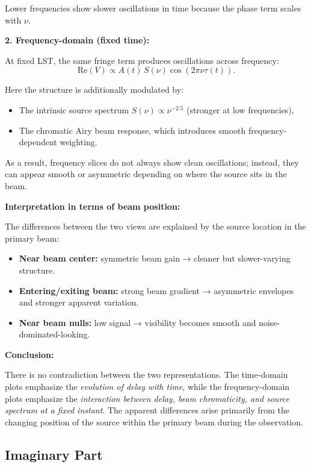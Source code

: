\documentclass{article}
\begin{document}
Lower frequencies show slower oscillations in time because the phase term scales with $\nu$.

\vspace{0.5em}
\textbf{2. Frequency-domain (fixed time):}

At fixed LST, the same fringe term produces oscillations across frequency:
\[
\mathrm{Re}(V) \propto A(t)\,S(\nu)\cos(2\pi\nu\tau(t)).
\]

Here the structure is additionally modulated by:
\begin{itemize}
    \item The intrinsic source spectrum $S(\nu) \propto \nu^{-2.5}$ (stronger at low frequencies),
    \item The chromatic Airy beam response, which introduces smooth frequency-dependent weighting.
\end{itemize}

As a result, frequency slices do not always show clean oscillations; instead, they can appear smooth or asymmetric depending on where the source sits in the beam.

\vspace{0.5em}
\textbf{Interpretation in terms of beam position:}

The differences between the two views are explained by the source location in the primary beam:
\begin{itemize}
    \item \textbf{Near beam center:} symmetric beam gain → cleaner but slower-varying structure.
    \item \textbf{Entering/exiting beam:} strong beam gradient → asymmetric envelopes and stronger apparent variation.
    \item \textbf{Near beam nulls:} low signal → visibility becomes smooth and noise-dominated-looking.
\end{itemize}

\vspace{0.5em}
\textbf{Conclusion:}

There is no contradiction between the two representations. The time-domain plots emphasize the \emph{evolution of delay with time}, while the frequency-domain plots emphasize the \emph{interaction between delay, beam chromaticity, and source spectrum at a fixed instant}. The apparent differences arise primarily from the changing position of the source within the primary beam during the observation.

\subsection{Imaginary Part}
\end{document}
